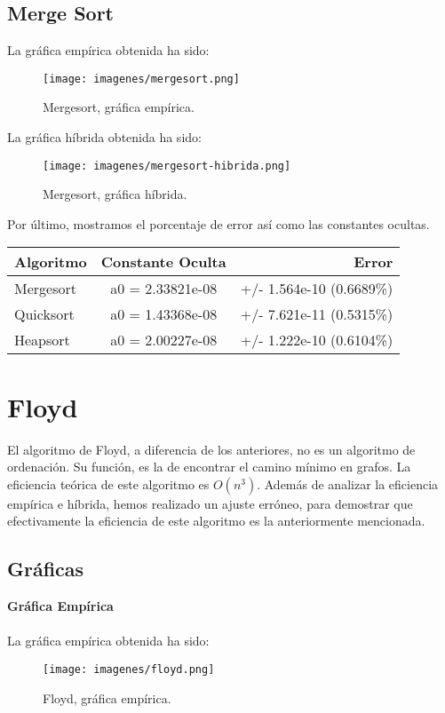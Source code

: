 \documentclass[a4paper, 11pt]{article} %
\begin{document}
\subsection{Merge Sort}
La gráfica empírica obtenida ha sido:
\begin{figure}[htb]
	\centering
	\texttt{[image: imagenes/mergesort.png]}
	\caption{Mergesort, gráfica empírica.}
	\label{fig:E14}
\end{figure}
La gráfica híbrida obtenida ha sido:
\begin{figure}[htb]
	\centering
	\texttt{[image: imagenes/mergesort-hibrida.png]}
	\caption{Mergesort, gráfica híbrida.}
	\label{fig:E15}
\end{figure}
Por último, mostramos el porcentaje de error así como las constantes ocultas.\\
\begin{center}
	\begin{tabular}{| l | c | r |}
		\hline
		\textbf{Algoritmo} & \textbf{Constante Oculta} & \textbf{Error} \\ \hline
		Mergesort & a0 = 2.33821e-08 & +/- 1.564e-10 (0.6689\%)\\ \hline
		Quicksort & a0 = 1.43368e-08 & +/- 7.621e-11 (0.5315\%) \\ \hline
		Heapsort & a0 = 2.00227e-08 & +/- 1.222e-10    (0.6104\%) \\ \hline
	\end{tabular}
\end{center}
	
\section{Floyd}

El algoritmo de Floyd, a diferencia de los anteriores, no es un algoritmo de ordenación. Su función, es la de encontrar el camino mínimo en grafos. La eficiencia teórica de este algoritmo es $O(n^3)$. Además de analizar la eficiencia empírica e híbrida, hemos realizado un ajuste erróneo, para demostrar que efectivamente la eficiencia de este algoritmo es la anteriormente mencionada.

\subsection{Gráficas}
\textbf{Gráfica Empírica}\\
\\
La gráfica empírica obtenida ha sido:
\begin{figure}[htb]
	\centering
	\texttt{[image: imagenes/floyd.png]}
	\caption{Floyd, gráfica empírica.}
	\label{fig:E16}
\end{figure}
	
\end{document}
